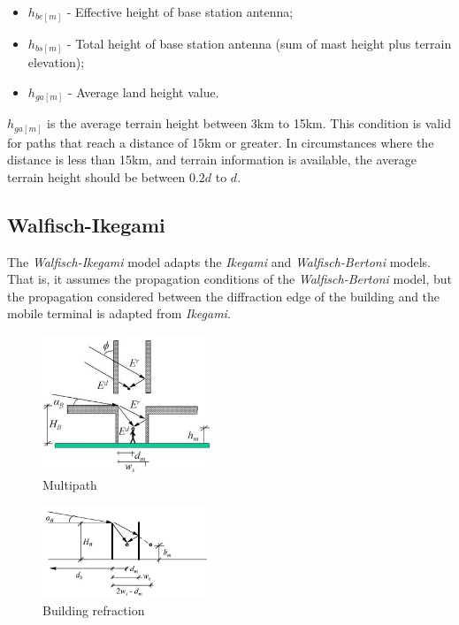 \documentclass[letterpaper, 10 pt, conference]{ieeeconf}  %
\begin{document}
\begin{itemize}
    \item[] $ h_ {be [m]} $ - Effective height of base station antenna;
    \item[] $ h_ {bs [m]} $ - Total height of base station antenna (sum of mast height plus terrain elevation);
    \item[] $ h_ {ga [m]} $ - Average land height value.
\end{itemize}
$h_ {ga [m]}$ is the average terrain height between 3km to 15km. This condition is valid for paths that reach a distance of  15km or greater. In circumstances where the distance is less than 15km, and terrain information is available, the average terrain height should be between $ 0.2d $ to $d$.
\subsection{Walfisch-Ikegami}\par \noindent
The \textit{Walfisch-Ikegami} model adapts the \textit{Ikegami} and \textit{Walfisch-Bertoni} models. That is, it assumes the propagation conditions of the \textit{Walfisch-Bertoni} model, but the propagation considered between the diffraction edge of the building and the mobile terminal is adapted from \textit{Ikegami}.
\begin{figure}[h]
    \centering
    \includegraphics[width=0.45\textwidth]{Wbertoni_efeitomultipercurso.jpg}
    \caption{Multipath}
    \label{fig:multipercurso}
\end{figure}
\begin{figure}[h]
    \centering
    \includegraphics[width=0.45\textwidth]{Ikegami.JPG}
    \caption{Building refraction}
    \label{fig:ikegami}
\end{figure}
\end{document}

